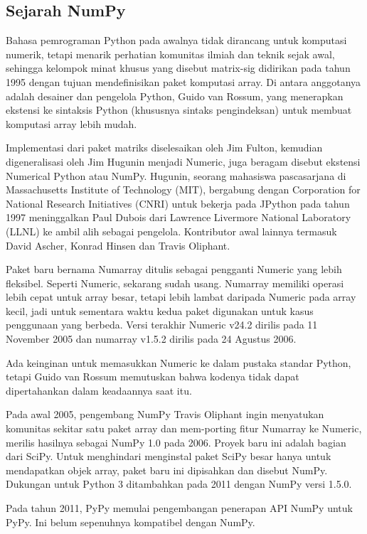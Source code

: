 \subsection{Sejarah NumPy}
Bahasa pemrograman Python pada awalnya tidak dirancang untuk komputasi numerik, tetapi menarik perhatian komunitas ilmiah dan teknik sejak awal, sehingga kelompok minat khusus yang disebut matrix-sig didirikan pada tahun 1995 dengan tujuan mendefinisikan paket komputasi array. Di antara anggotanya adalah desainer dan pengelola Python, Guido van Rossum, yang menerapkan ekstensi ke sintaksis Python (khususnya sintaks pengindeksan) untuk membuat komputasi array lebih mudah.

Implementasi dari paket matriks diselesaikan oleh Jim Fulton, kemudian digeneralisasi oleh Jim Hugunin menjadi Numeric, juga beragam disebut ekstensi Numerical Python atau NumPy. Hugunin, seorang mahasiswa pascasarjana di Massachusetts Institute of Technology (MIT), bergabung dengan Corporation for National Research Initiatives (CNRI) untuk bekerja pada JPython pada tahun 1997 meninggalkan Paul Dubois dari Lawrence Livermore National Laboratory (LLNL) ke ambil alih sebagai pengelola. Kontributor awal lainnya termasuk David Ascher, Konrad Hinsen dan Travis Oliphant.

Paket baru bernama Numarray ditulis sebagai pengganti Numeric yang lebih fleksibel. Seperti Numeric, sekarang sudah usang. Numarray memiliki operasi lebih cepat untuk array besar, tetapi lebih lambat daripada Numeric pada array kecil, jadi untuk sementara waktu kedua paket digunakan untuk kasus penggunaan yang berbeda. Versi terakhir Numeric v24.2 dirilis pada 11 November 2005 dan numarray v1.5.2 dirilis pada 24 Agustus 2006.

Ada keinginan untuk memasukkan Numeric ke dalam pustaka standar Python, tetapi Guido van Rossum memutuskan bahwa kodenya tidak dapat dipertahankan dalam keadaannya saat itu.

Pada awal 2005, pengembang NumPy Travis Oliphant ingin menyatukan komunitas sekitar satu paket array dan mem-porting fitur Numarray ke Numeric, merilis hasilnya sebagai NumPy 1.0 pada 2006. Proyek baru ini adalah bagian dari SciPy. Untuk menghindari menginstal paket SciPy besar hanya untuk mendapatkan objek array, paket baru ini dipisahkan dan disebut NumPy. Dukungan untuk Python 3 ditambahkan pada 2011 dengan NumPy versi 1.5.0.

Pada tahun 2011, PyPy memulai pengembangan penerapan API NumPy untuk PyPy. Ini belum sepenuhnya kompatibel dengan NumPy.

